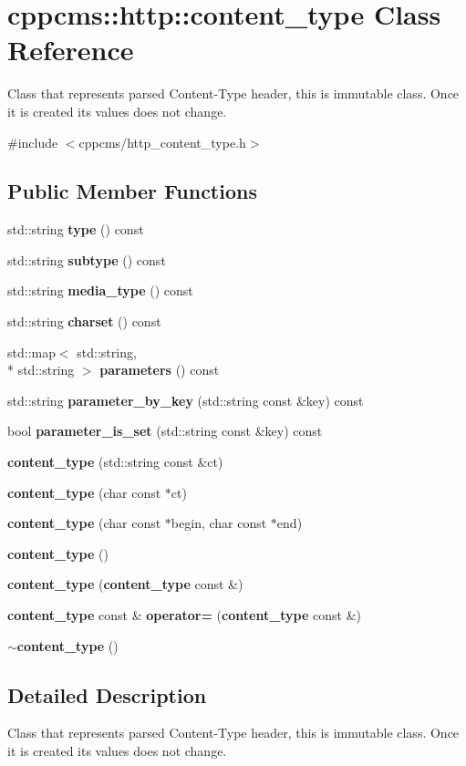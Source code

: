 \section{cppcms\-:\-:http\-:\-:content\-\_\-type Class Reference}
\label{classcppcms_1_1http_1_1content__type}


Class that represents parsed Content-\/\-Type header, this is immutable class. Once it is created its values does not change.  




{\ttfamily \#include $<$cppcms/http\-\_\-content\-\_\-type.\-h$>$}

\subsection*{Public Member Functions}
\begin{DoxyCompactItemize}
\item 
std\-::string {\bf type} () const 
\item 
std\-::string {\bf subtype} () const 
\item 
std\-::string {\bf media\-\_\-type} () const 
\item 
std\-::string {\bf charset} () const 
\item 
std\-::map$<$ std\-::string, \\*
std\-::string $>$ {\bf parameters} () const 
\item 
std\-::string {\bf parameter\-\_\-by\-\_\-key} (std\-::string const \&key) const 
\item 
bool {\bf parameter\-\_\-is\-\_\-set} (std\-::string const \&key) const 
\item 
{\bf content\-\_\-type} (std\-::string const \&ct)
\item 
{\bf content\-\_\-type} (char const $\ast$ct)
\item 
{\bf content\-\_\-type} (char const $\ast$begin, char const $\ast$end)
\item 
{\bf content\-\_\-type} ()
\item 
{\bf content\-\_\-type} ({\bf content\-\_\-type} const \&)
\item 
{\bf content\-\_\-type} const \& {\bf operator=} ({\bf content\-\_\-type} const \&)
\item 
{\bf $\sim$content\-\_\-type} ()
\end{DoxyCompactItemize}


\subsection{Detailed Description}
Class that represents parsed Content-\/\-Type header, this is immutable class. Once it is created its values does not change. 

